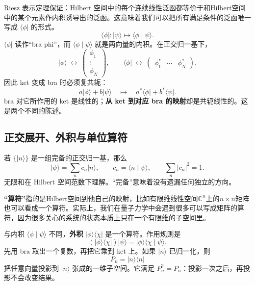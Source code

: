 \documentclass[a4paper,11pt]{article}
\numberwithin{equation}{section}
\newcommand{\ket}[1]{\lvert #1\rangle}
\newcommand{\bra}[1]{\langle #1\rvert}
\newcommand{\braket}[2]{\langle #1\mid #2\rangle}
\newcommand{\abs}[1]{\lvert #1\rvert}
\begin{document}
Riesz 表示定理保证：Hilbert 空间中的每个连续线性泛函都等价于和Hilbert空间中的某个元素作内积诱导出的泛函。这意味着我们可以把所有满足条件的泛函唯一写成 $\bra{\phi}$ 的形式。
\begin{equation}
  \bra{\phi}:\ket{\psi}\longmapsto\braket{\phi}{\psi}.
\end{equation}
$\bra{\phi}$ 读作“bra phi”，而 $\braket{\phi}{\psi}$ 就是两向量的内积。在正交归一基下，
\begin{equation}
  \ket{\phi}\ \longleftrightarrow\
  \begin{pmatrix}\phi_1\\ \vdots\\ \phi_N\end{pmatrix},
  \qquad
  \bra{\phi}\ \longleftrightarrow\
  \begin{pmatrix}\phi_1^*&\cdots&\phi_N^*\end{pmatrix}.
\end{equation}
因此 ket 变成 bra 时必须复共轭：
\begin{equation}
  a\ket{\phi}+b\ket{\psi}
  \quad\longmapsto\quad
  a^*\bra{\phi}+b^*\bra{\psi}.
\end{equation}
bra 对它所作用的 ket 是线性的；\textbf{从 ket 到对应 bra 的映射}却是共轭线性的。这是两个不同的陈述。


\subsection{正交展开、外积与单位算符}
若 $\{\ket{n}\}$ 是一组完备的正交归一基，那么
\begin{equation}\label{eq:expansion}
  \ket{\psi}=\sum_n c_n\ket{n},\qquad
  c_n=\braket{n}{\psi},\qquad \sum_n\abs{c_n}^2=1.
\end{equation}
无限和在 Hilbert 空间范数下理解。“完备”意味着没有遗漏任何独立的方向。

\textbf{“算符”}指的是Hilbert空间到他自己的映射，比如有限维线性空间$\mathbb{C}^n$上的$n\times n$矩阵也可以看成一个算符。实际上，我们在量子力学中会遇到很多可以写成矩阵的算符，因为很多关心的系统的状态本质上只在一个有限维的子空间里。

与内积 $\braket{\phi}{\psi}$ 不同，\textbf{外积} $\ket{\phi}\bra{\chi}$ 是一个算符。作用规则是
\begin{equation}
  (\ket{\phi}\bra{\chi})\ket{\psi}
  =\ket{\phi}\braket{\chi}{\psi}.
\end{equation}
先用 bra 取出一个复数，再把它乘到 ket 上。如果 $\ket{n}$ 已归一化，则
\[
  P_n=\ket{n}\bra{n}
\]
把任意向量投影到 $\ket{n}$ 张成的一维子空间。它满足 $P_n^2=P_n$：投影一次之后，再投影不会改变结果。
\end{document}
